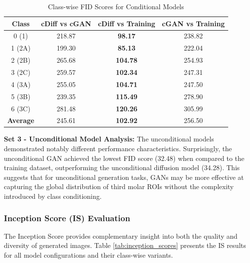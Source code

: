 \begin{table}[htbp]
\centering
\caption{Class-wise FID Scores for Conditional Models}
\label{tab:fid_classwise}
\scriptsize
\begin{tabular}{|c|c|c|c|}
\hline
\textbf{Class} & \textbf{cDiff vs cGAN} & \textbf{cDiff vs Training} & \textbf{cGAN vs Training} \\
\hline
0 (1) & 218.87 & \textbf{98.17} & 238.82 \\
1 (2A) & 199.30 & \textbf{85.13} & 222.04 \\
2 (2B) & 265.68 & \textbf{104.78} & 254.93 \\
3 (2C) & 259.57 & \textbf{102.34} & 247.31 \\
4 (3A) & 255.05 & \textbf{104.71} & 247.50 \\
5 (3B) & 239.35 & \textbf{115.49} & 278.90 \\
6 (3C) & 281.48 & \textbf{120.26} & 305.99 \\
\hline
\textbf{Average} & 245.61 & \textbf{102.92} & 256.50 \\
\hline
\end{tabular}
\end{table}

\textbf{Set 3 - Unconditional Model Analysis:} The unconditional models demonstrated notably different performance characteristics. Surprisingly, the unconditional GAN achieved the lowest FID score (32.48) when compared to the training dataset, outperforming the unconditional diffusion model (34.28). This suggests that for unconditional generation tasks, GANs may be more effective at capturing the global distribution of third molar ROIs without the complexity introduced by class conditioning.

\subsubsection{Inception Score (IS) Evaluation}

The Inception Score provides complementary insight into both the quality and diversity of generated images. Table \ref{tab:inception_scores} presents the IS results for all model configurations and their class-wise variants.

